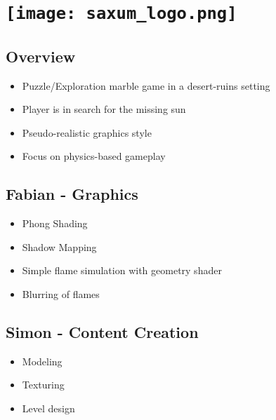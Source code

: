 \documentclass{beamer}
\title{\myTitle}
\author{\myAutors}
\institute{RWTH Aachen University}
\date{\today}
\newcommand{\myTitle}{\texttt{[image: saxum\_logo.png]}}
\begin{document}
\begin{frame}
    \titlepage
\end{frame}

\section{\myTitle}

\subsection{Overview}

\begin{frame}
	\begin{itemize}
		\item Puzzle/Exploration marble game in a desert-ruins setting
		\item Player is in search for the missing sun
		\item Pseudo-realistic graphics style
		\item Focus on physics-based gameplay
	\end{itemize}
\end{frame}



\subsection{Fabian - Graphics}
\begin{frame}
    \begin{itemize}
		\item Phong Shading
		\item Shadow Mapping
		\item Simple flame simulation with geometry shader
		\item Blurring of flames
    \end{itemize}
\end{frame}

\subsection{Simon - Content Creation}
\begin{frame}
    \begin{itemize}
    	\item Modeling
    	\item Texturing
    	\item Level design   	
    \end{itemize}
\end{frame}
\end{document}

